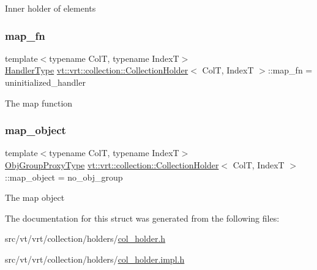 Inner holder of elements \mbox{\label{structvt_1_1vrt_1_1collection_1_1_collection_holder_a1bacbcdc0af1d6a69abf890304c78233}} 
\subsubsection{\texorpdfstring{map\+\_\+fn}{map\_fn}}
{\footnotesize\ttfamily template$<$typename ColT, typename IndexT$>$ \\
\hyperlink{namespacevt_af64846b57dfcaf104da3ef6967917573}{Handler\+Type} \hyperlink{structvt_1_1vrt_1_1collection_1_1_collection_holder}{vt\+::vrt\+::collection\+::\+Collection\+Holder}$<$ ColT, IndexT $>$\+::map\+\_\+fn = uninitialized\+\_\+handler}

The map function \mbox{\label{structvt_1_1vrt_1_1collection_1_1_collection_holder_a719c913a9d373289043f39a344012090}} 
\subsubsection{\texorpdfstring{map\+\_\+object}{map\_object}}
{\footnotesize\ttfamily template$<$typename ColT, typename IndexT$>$ \\
\hyperlink{namespacevt_ad7cae989df485fccca57f0792a880a8e}{Obj\+Group\+Proxy\+Type} \hyperlink{structvt_1_1vrt_1_1collection_1_1_collection_holder}{vt\+::vrt\+::collection\+::\+Collection\+Holder}$<$ ColT, IndexT $>$\+::map\+\_\+object = no\+\_\+obj\+\_\+group}

The map object 

The documentation for this struct was generated from the following files\+:\begin{DoxyCompactItemize}
\item 
src/vt/vrt/collection/holders/\hyperlink{col__holder_8h}{col\+\_\+holder.\+h}\item 
src/vt/vrt/collection/holders/\hyperlink{col__holder_8impl_8h}{col\+\_\+holder.\+impl.\+h}\end{DoxyCompactItemize}
